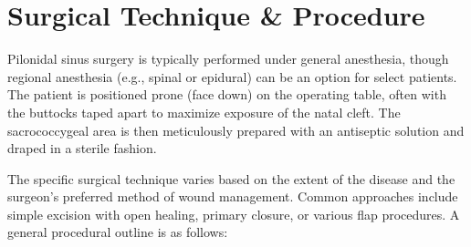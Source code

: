 \section*{Surgical Technique \& Procedure}
Pilonidal sinus surgery is typically performed under general anesthesia, though regional anesthesia (e.g., spinal or epidural) can be an option for select patients. The patient is positioned prone (face down) on the operating table, often with the buttocks taped apart to maximize exposure of the natal cleft. The sacrococcygeal area is then meticulously prepared with an antiseptic solution and draped in a sterile fashion.

The specific surgical technique varies based on the extent of the disease and the surgeon's preferred method of wound management. Common approaches include simple excision with open healing, primary closure, or various flap procedures. A general procedural outline is as follows:

